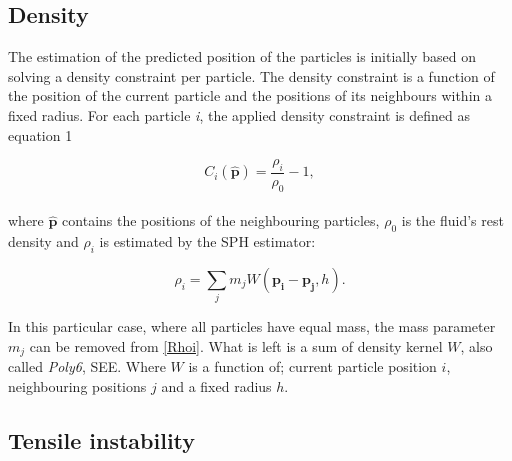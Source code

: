 \subsection{Density}

The estimation of the predicted position of the particles is initially based on solving a density constraint per particle. The density constraint is a function of the position of the current particle and the positions of its neighbours within a fixed radius. For each particle \textit{i}, the applied density constraint is defined as equation 1

\begin{equation}
\label{eq:Ci}
C_i(\hat{\mathbf{p}}) = \frac{\rho_i}{\rho_0} - 1,
\end{equation}
\\
where $\hat{\mathbf{p}}$ contains the positions of the neighbouring particles, $\rho_0$ is the fluid's rest density and $\rho_i$ is estimated by the SPH estimator:

\begin{equation}
\label{Rhoi}
\rho_i = \sum\limits_{j} m_j W(\mathbf{p_i} - \mathbf{p_j}, h).
\end{equation}

In this particular case, where all particles have equal mass, the mass parameter $m_j$ can be removed from \ref{Rhoi}. What is left is a sum of density kernel $W$, also called \textit{Poly6}, SEE. Where $W$ is a function of; current particle position $i$, neighbouring positions $j$ and a fixed radius $h$.

\subsection{Tensile instability}






















